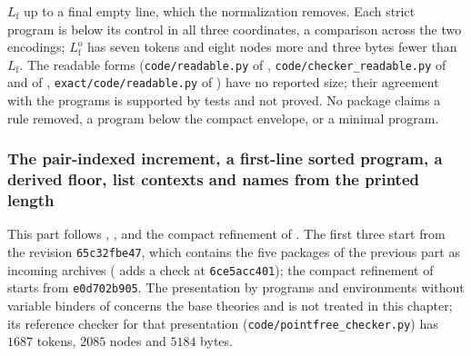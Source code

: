 $L_{\mathrm f}$ up to a final empty line, which the normalization removes. Each strict program
is below its control in all three coordinates, a comparison across the two encodings;
$L^{\mathrm o}_{\mathrm f}$ has seven tokens and eight nodes more and three bytes fewer than
$L_{\mathrm f}$. The readable forms (\texttt{code/readable.py} of ,
\texttt{code/checker\_readable.py} of  and of ,
\texttt{exact/code/readable.py} of ) have no reported size; their
agreement with the programs is supported by tests and not proved. No package claims a rule
removed, a program below the compact envelope, or a minimal program.

\subsubsection*{The pair-indexed increment, a first-line sorted program, a derived floor, list contexts and names from the printed length}

This part follows , ,  and the
compact refinement of . The first three start from the revision
\texttt{65c32fbe47}, which contains the five packages of the previous part as incoming archives
( adds a check at \texttt{6ce5acc401}); the compact refinement of
 starts from \texttt{e0d702b905}. The presentation by programs and environments
without variable binders of  concerns the base theories and is not treated in
this chapter; its reference checker for that presentation (\texttt{code/pointfree\_checker.py})
has $1687$ tokens, $2085$ nodes and $5184$ bytes.

